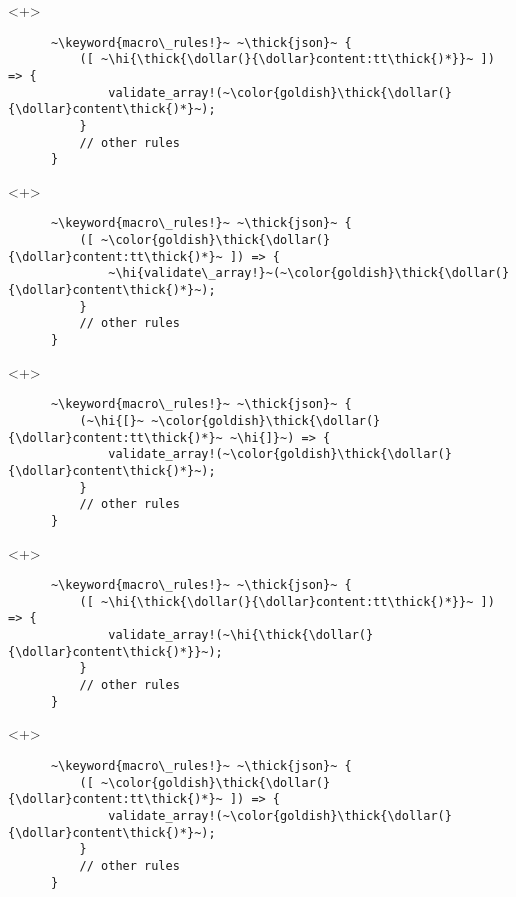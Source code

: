 \documentclass[usepdftitle=false,aspectratio=169]{beamer}
\newcommand{\dollar}{\makebox[\widthof{\$}][c]{\$}}
\newcommand{\thick}[1]{\contourlength{0.16pt}\contour[10]{black}{#1}}
\newcommand{\hi}[1]{%
\tikz[baseline=(A.base)]
 \node[highlighting=yellowbg,inner sep=0pt,text depth=0pt] (A) {#1};%
}
\newcommand{\keyword}[1]{\color{greenish}#1}
\begin{document}
\begin{frame}[fragile]
  \begin{onlyenv}<+>
    \begin{verbatim}
      ~\keyword{macro\_rules!}~ ~\thick{json}~ {
          ([ ~\hi{\thick{\dollar(}{\dollar}content:tt\thick{)*}}~ ]) => {
              validate_array!(~\color{goldish}\thick{\dollar(}{\dollar}content\thick{)*}~);
          }
          // other rules
      }
    \end{verbatim}
  \end{onlyenv}
  \begin{onlyenv}<+>
    \begin{verbatim}
      ~\keyword{macro\_rules!}~ ~\thick{json}~ {
          ([ ~\color{goldish}\thick{\dollar(}{\dollar}content:tt\thick{)*}~ ]) => {
              ~\hi{validate\_array!}~(~\color{goldish}\thick{\dollar(}{\dollar}content\thick{)*}~);
          }
          // other rules
      }
    \end{verbatim}
  \end{onlyenv}
  \begin{onlyenv}<+>
    \begin{verbatim}
      ~\keyword{macro\_rules!}~ ~\thick{json}~ {
          (~\hi{[}~ ~\color{goldish}\thick{\dollar(}{\dollar}content:tt\thick{)*}~ ~\hi{]}~) => {
              validate_array!(~\color{goldish}\thick{\dollar(}{\dollar}content\thick{)*}~);
          }
          // other rules
      }
    \end{verbatim}
  \end{onlyenv}
  \begin{onlyenv}<+>
    \begin{verbatim}
      ~\keyword{macro\_rules!}~ ~\thick{json}~ {
          ([ ~\hi{\thick{\dollar(}{\dollar}content:tt\thick{)*}}~ ]) => {
              validate_array!(~\hi{\thick{\dollar(}{\dollar}content\thick{)*}}~);
          }
          // other rules
      }
    \end{verbatim}
  \end{onlyenv}
  \begin{onlyenv}<+>
    \begin{verbatim}
      ~\keyword{macro\_rules!}~ ~\thick{json}~ {
          ([ ~\color{goldish}\thick{\dollar(}{\dollar}content:tt\thick{)*}~ ]) => {
              validate_array!(~\color{goldish}\thick{\dollar(}{\dollar}content\thick{)*}~);
          }
          // other rules
      }
    \end{verbatim}
  \end{onlyenv}
\end{frame}
\end{document}

